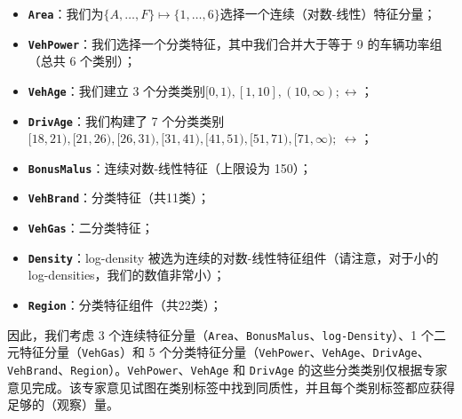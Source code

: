 \documentclass[
]{article}
\providecommand{\tightlist}{%
  \setlength{\itemsep}{0pt}\setlength{\parskip}{0pt}}
\begin{document}
\begin{itemize}
\tightlist
\item
  \textbf{\texttt{Area}}：我们为\(\{A,\ldots,F\}\mapsto\{1,\ldots,6\}\)选择一个连续（对数-线性）特征分量；
\item
  \textbf{\texttt{VehPower}}：我们选择一个分类特征，其中我们合并大于等于
  9 的车辆功率组（总共 6 个类别）；
\item
  \textbf{\texttt{VehAge}}：我们建立 3
  个分类类别\([0,1),[1,10],(10,\infty);\leftrightarrow\)；
\item
  \textbf{\texttt{DrivAge}}：我们构建了 7
  个分类类别\([18,21),[21,26),[26,31),[31,41),[41,51),[51,71),[71,\infty);~\leftrightarrow\)；
\item
  \textbf{\texttt{BonusMalus}}：连续对数-线性特征（上限设为 150）；
\item
  \textbf{\texttt{VehBrand}}：分类特征（共11类）；
\item
  \textbf{\texttt{VehGas}}：二分类特征；
\item
  \textbf{\texttt{Density}}：log-density
  被选为连续的对数-线性特征组件（请注意，对于小的
  log-densities，我们的数值非常小）；
\item
  \textbf{\texttt{Region}}：分类特征组件（共22类）；
\end{itemize}

因此，我们考虑 3
个连续特征分量（\texttt{Area}、\texttt{BonusMalus}、\texttt{log-Density}）、1
个二元特征分量（\texttt{VehGas}）和 5
个分类特征分量（\texttt{VehPower}、\texttt{VehAge}、\texttt{DrivAge}、\texttt{VehBrand}、\texttt{Region}）。\texttt{VehPower}、\texttt{VehAge}
和 \texttt{DrivAge}
的这些分类类别仅根据专家意见完成。该专家意见试图在类别标签中找到同质性，并且每个类别标签都应获得足够的（观察）量。
\end{document}
